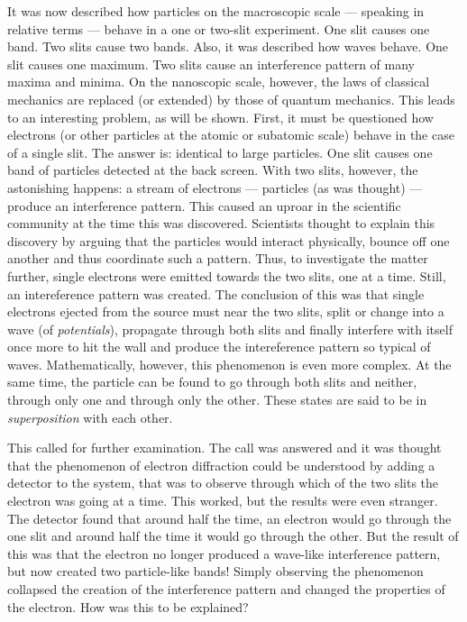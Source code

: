 It was now described how particles on the macroscopic scale --- speaking in relative terms --- behave in a one or two-slit experiment. One slit causes one band. Two slits cause two bands. Also, it was described how waves behave. One slit causes one maximum. Two slits cause an interference pattern of many maxima and minima. On the nanoscopic scale, however, the laws of classical mechanics are replaced (or extended) by those of quantum mechanics. This leads to an interesting problem, as will be shown. First, it must be questioned how electrons (or other particles at the atomic or subatomic scale) behave in the case of a single slit. The answer is: identical to large particles. One slit causes one band of particles detected at the back screen. With two slits, however, the astonishing happens: a stream of electrons --- particles (as was thought) --- produce an interference pattern. This caused an uproar in the scientific community at the time this was discovered. Scientists thought to explain this discovery by arguing that the particles would interact physically, bounce off one another and thus coordinate such a pattern. Thus, to investigate the matter further, single electrons were emitted towards the two slits, one at a time. Still, an intereference pattern was created. The conclusion of this was that single electrons ejected from the source must near the two slits, split or change into a wave (of \emph{potentials}), propagate through both slits and finally interfere with itself once more to hit the wall and produce the intereference pattern so typical of waves. Mathematically, however, this phenomenon is even more complex. At the same time, the particle can be found to go through both slits and neither, through only one and through only the other. These states are said to be in \emph{superposition} with each other.

This called for further examination. The call was answered and it was thought that the phenomenon of electron diffraction could be understood by adding a detector to the system, that was to observe through which of the two slits the electron was going at a time. This worked, but the results were even stranger. The detector found that around half the time, an electron would go through the one slit and around half the time it would go through the other. But the result of this was that the electron no longer produced a wave-like interference pattern, but now created two particle-like bands! Simply observing the phenomenon collapsed the creation of the interference pattern and changed the properties of the electron. How was this to be explained?


